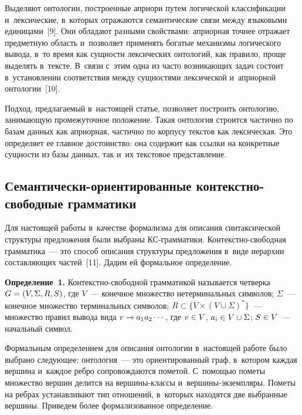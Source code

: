 \begin{multicols}{2}
  Выделяют онтологии, построенные априори путем логической 
классификации и~лексические, в~которых отражаются семантические связи 
между языковыми единицами~[9]. Они обладают разными свойствами: 
априорная точнее отражает предметную область и~позволяет применять 
богатые механизмы логического вывода, в~то время как сущности лексических 
онтологий, как правило, проще выделять в~тексте. В~связи с~этим одна из часто 
возникающих задач состоит в~установлении соответствия между сущностями 
лексической и~априорной онтологии~[10].
  
  Подход, предлагаемый в~настоящей статье, позволяет построить онтологию, 
занимающую промежуточное положение. Такая онтология строится частично 
по базам данных как априорная, частично по корпусу текстов как лексическая. 
Это определяет ее главное достоинство: она содержит как ссылки на 
конкретные сущности из базы данных, так и~их текстовое представление.

\vspace*{-10pt}
  
  \subsection{Семантически-ориентированные контекстно-свободные грамматики}
  
  Для настоящей работы в~качестве формализма для описания синтаксической 
структуры предложения были выбраны КС-грам\-ма\-ти\-ки. Контекстно-свободная
грам\-ма\-ти\-ка~--- это способ описания структуры 
предложения в~виде иерархии составляющих частей~[11]. Дадим ей 
формальное определение.
  
  \vspace*{1pt}
  
  \noindent
  \textbf{Определение~1.} Кон\-тек\-ст\-но-сво\-бод\-ной грамматикой 
называется четверка $G\hm=(V,\Sigma, R, S)$, где $V$~--- конечное множество 
нетерминальных символов; $\Sigma$~--- конечное множество терминальных 
символов; $R\subset \{V\times (V\cup \Sigma)^*\}$~--- множество правил вывода 
вида $v\hm\to a_1a_2\cdots$, где $v\hm\in V$, $a_i\hm\in V\cup \Sigma$; $S\hm\in 
V$~--- начальный символ.
  
\pagebreak
  
  Формальным определением для описания онтологии в~настоящей работе 
было выбрано следующее: онтология~--- это ориентированный граф, в~котором 
каждая вершина и~каждое ребро со\-про\-вож\-да\-ют\-ся пометой. С~помощью пометы 
множество вершин делится на вер\-ши\-ны-клас\-сы  
и~вер\-ши\-ны-эк\-земп\-ля\-ры. Пометы на ребрах устанавливают тип 
отношений, в~которых находятся две выбранные вершины. Приведем более 
формализованное определение.
  

\end{multicols}
